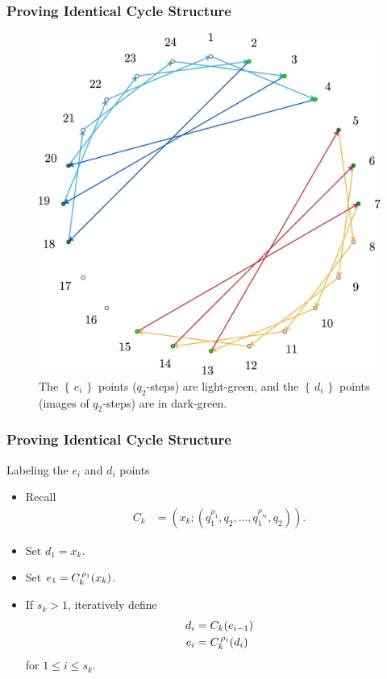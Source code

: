 \documentclass{beamer}
\theoremstyle{plain}
\theoremstyle{definition}
\theoremstyle{remark}
\newcommand{\bee}{\begin{equation}\begin{aligned}}
\newcommand{\eee}{\end{aligned}\end{equation}}
\newcommand{\lpar}{\left(}				%
\newcommand{\rpar}{\right)}
\renewcommand{\leq}{\leqslant}			%
\renewcommand{\'}{\hspace{0.5mm}'}		%
\renewcommand{\Set}[1]{\left\{\,#1\,\right\}}	%
\begin{document}

\begin{frame}
\frametitle{Proving Identical Cycle Structure}

	\begin{figure}
		\includegraphics[scale=0.15]{circ_24_3_16_16_6_ed.jpg}
		\caption{The $\Set{e_i}$ points ($q_2$-steps)
		are light-green, and the $\Set{d_i}$ points (images of 
		$q_2$-steps) are in dark-green. }
	\end{figure}
	

\end{frame}


\begin{frame}
\frametitle{Proving Identical Cycle Structure}

	\begin{block}{Labeling the $e_i$ and $d_i$ points}
		\begin{itemize}
			\item Recall
			\bee
				C_k 
				&=
					\lpar 
						x_k; (q_1^{\rho_1},q_2,\hdots, 
						q_1^{\rho_{s_k}},q_2)
					\rpar. 
			\eee
			\item Set $d_1 = x_k$. 
			\item Set $e_1 = C_k^{\hspace{0.5mm}\rho_1}(x_k)$. 
			\item If $s_k > 1$, iteratively define
			\bee
				d_i &= C_k(e_{i - 1})\\
				e_i &= C_k^{\hspace{0.5mm}\rho_i}(d_i)
			\eee
			for $1 \leq i \leq s_k$. 
		\end{itemize}
	\end{block}
	

\end{frame}
\end{document}
